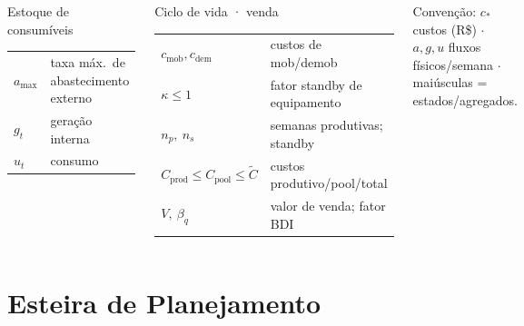 \documentclass[aspectratio=169,10pt]{beamer}
\begin{document}
\begin{frame}
\begin{columns}[T]
\begin{block}{\small Estoque de consumíveis}
\begin{tabular}{@{}p{1.5cm}p{4.6cm}@{}}
        $a_{\max}$ & taxa máx.\ de abastecimento externo \\
        $g_t$ & geração interna \\
        $u_t$ & consumo \\
      \end{tabular}
    \end{block}
    \begin{block}{\small Ciclo de vida · venda}
      \begin{tabular}{@{}p{1.5cm}p{4.6cm}@{}}
        $c_{\text{mob}},c_{\text{dem}}$ & custos de mob/demob \\
        $\kappa \leq 1$ & fator standby de equipamento \\
        $n_p,\ n_s$ & semanas produtivas; standby \\
        $C_{\text{prod}} \!\leq\! C_{\text{pool}} \!\leq\! \tilde{C}$ & custos produtivo/pool/total \\
        $V,\ \beta_q$ & valor de venda; fator BDI \\
      \end{tabular}
    \end{block}
    \vspace{2pt}
    {\tiny Convenção: $c_\ast$ custos (R\$) $\cdot$ $a,g,u$ fluxos físicos/semana
    $\cdot$ maiúsculas = estados/agregados.}
  \end{columns}
\end{frame}

\section{Esteira de Planejamento}
\end{document}
